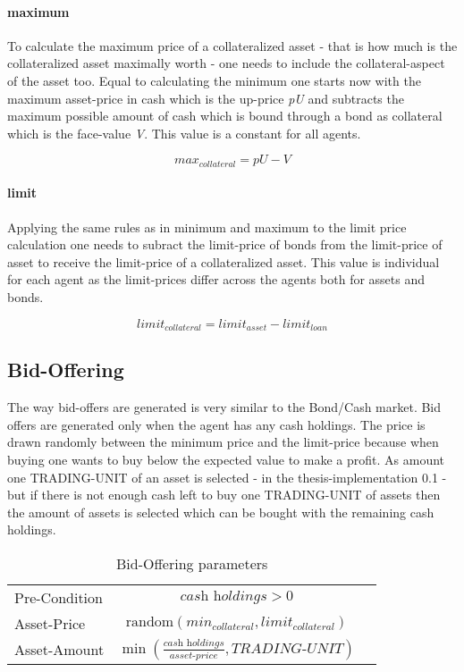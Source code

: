 \documentclass[Bachelorarbeit.tex]{subfiles}
\begin{document}
\paragraph{maximum}
To calculate the maximum price of a collateralized asset - that is how much is the collateralized asset maximally worth - one needs to include the collateral-aspect of the asset too. Equal to calculating the minimum one starts now with the maximum asset-price in cash which is the up-price \textit{pU} and subtracts the maximum possible amount of cash which is bound through a bond as collateral which is the face-value \textit{V}. This value is a constant for all agents.

\begin{equation}
max_{collateral} = \textit{pU} - \textit{V}
\end{equation}

\paragraph{limit}
Applying the same rules as in minimum and maximum to the limit price calculation one needs to subract the limit-price of bonds from the limit-price of asset to receive the limit-price of a collateralized asset. This value is individual for each agent as the limit-prices differ across the agents both for assets and bonds.

\begin{equation}
limit_{collateral} = limit_{asset} - limit_{loan}
\end{equation}

\subsection{Bid-Offering}
The way bid-offers are generated is very similar to the Bond/Cash market. Bid offers are generated only when the agent has any cash holdings. The price is drawn randomly between the minimum price and the limit-price because when buying one wants to buy below the expected value to make a profit. As amount one TRADING-UNIT of an asset is selected - in the thesis-implementation 0.1 - but if there is not enough cash left to buy one TRADING-UNIT of assets then the amount of assets is selected which can be bought with the remaining cash holdings.

\begin{table}[H]
	\centering
	\caption{Bid-Offering parameters}
	\begin{tabular} { l c r }
		\hline
		Pre-Condition & $\textit{cash holdings} > 0$  \\
		Asset-Price & $\mathrm{random}(min_{collateral}, limit_{collateral})$ \\
		Asset-Amount & $\min ( \frac{ \textit{cash holdings} }{ \textit{asset-price} }, \textit{TRADING-UNIT} )$ \\
		\hline
	\end{tabular}
\end{table}
\end{document}
